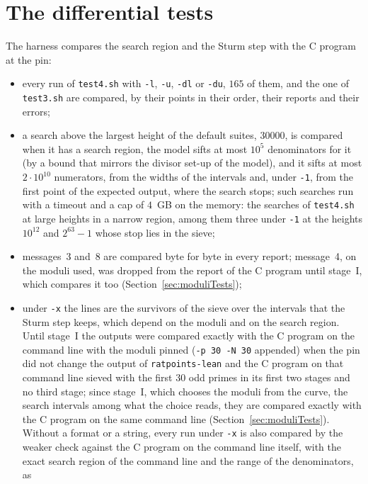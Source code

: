 \section{The differential tests}\label{sec:regionTests}

The harness compares the search region and the Sturm step with the C program at the pin:
\begin{itemize}
  \item every run of \verb|test4.sh| with \verb|-l|, \verb|-u|, \verb|-dl| or \verb|-du|, $165$ of
    them, and the one of \verb|test3.sh| are compared, by their points in their order, their
    reports and their errors;
  \item a search above the largest height of the default suites, $30000$, is compared when it has
    a search region, the model sifts at most $10^5$ denominators for it (by a bound that mirrors the
    divisor set-up of the model), and it sifts at most $2 \cdot 10^{10}$ numerators, from the widths
    of the intervals and, under \verb|-1|, from the first point of the expected output, where the
    search stops; such searches run with a timeout and a cap of $4$~GB on the memory: the searches
    of \verb|test4.sh| at large heights in a narrow region, among them three under \verb|-1| at the
    heights $10^{12}$ and $2^{63} - 1$ whose stop lies in the sieve;
  \item messages~3 and~8 are compared byte for byte in every report; message~4, on the moduli used,
    was dropped from the report of the C program until stage~I, which compares it too
    (Section~\ref{sec:moduliTests});
  \item under \verb|-x| the lines are the survivors of the sieve over the intervals that the Sturm
    step keeps, which depend on the moduli and on the search region. Until stage~I the outputs were
    compared exactly with the C program on the command line with the moduli pinned
    (\verb|-p 30 -N 30| appended) when the pin did not change the output of \verb|ratpoints-lean|
    and the C program on that command line sieved with the first $30$ odd primes in its first two
    stages and no third stage; since stage~I, which chooses the moduli from the curve, the search
    intervals among what the choice reads, they are compared exactly with the C program on the same
    command line (Section~\ref{sec:moduliTests}). Without a format or a string, every run under
    \verb|-x| is also compared by the weaker check against the C program on the command line itself,
    with the exact search region of the command line and the range of the denominators, as

\end{itemize}
